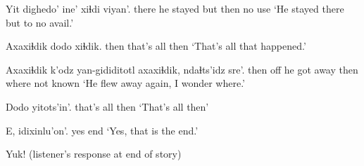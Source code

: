 \documentclass[12pt]{article}
\begin{document}
\gll Yit dighedo' ine' xiɬdi viyan'.
there {he stayed} but then {no use}
\glt `He stayed there but to no avail.'
\glend

\gll Axaxiɬdik dodo  xiɬdik.
then  {that's all} then
\glt `That's all that happened.'
\glend

\gll Axaxiɬdik k'odz yan-gididitotl axaxiɬdik, ndaɬts'idz sre'.
then  off {he got away} then where  {not known}
\glt `He flew away again, I wonder where.'
\glend

\gll Dodo  yitots'in'.
{that's all} then
\glt `That's all then'
\glend

\gll E, idixinlu'on'.
yes  end
\glt `Yes, that is the end.'
\glend

\gll  Yuk!
{(listener's response at end of story)}
\glt
\glend
\end{document}
